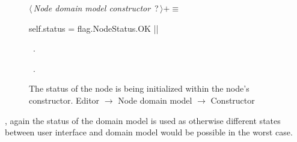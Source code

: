 \documentclass[%
    a4paper,    %
    justified,  %
    nobib,      %
    openany     %
]{tufte-book}
\makeatletter
\renewcommand{\label}[1]{\@tufte@label{##1}}%
\makeatother
\begin{document}
\begin{figure}
\begin{flushleft} \small
\begin{minipage}{\linewidth}\label{scrap76}\raggedright\small
{} $\langle\,${\itshape Node domain model constructor}\nobreak\ {\footnotesize {?}}$\,\rangle+\equiv$
\vspace{-1ex}
\begin{pythoncode}
    self.status = flag.NodeStatus.OK
|\NWsep|
\end{pythoncode}
\vspace{1.5ex}
\footnotesize
\begin{list}{}{\setlength{\itemsep}{-\parsep}\setlength{\itemindent}{-\leftmargin}}
\item \NWtxtMacroDefBy\ .
\item \NWtxtMacroRefIn\ .

\item{}
\end{list}
\end{minipage}\vspace{4ex}
\end{flushleft}
\caption{The status of the node is being initialized within the node's constructor.
  \newline{}\newline{}Editor $\rightarrow$ Node domain model $\rightarrow$
  Constructor}
\label{editor:lst:node-domain-model:constructor:status}
\end{figure}

, again the status of the domain model is
used as otherwise different states between user interface and domain model would
be possible in the worst case.
\end{document}
